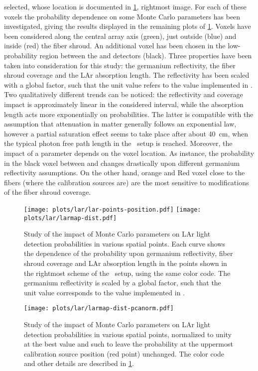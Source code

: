 selected, whose location is documented in \cref{fig:bkg:lar:ph2:larmap:dist}, rightmost
image. For each of these voxels the probability dependence on some Monte Carlo parameters
has been investigated, giving the results displayed in the remaining plots of
\cref{fig:bkg:lar:ph2:larmap:dist}. Voxels have been considered along the central array
axis (green), just outside (blue) and inside (red) the fiber shroud. An additional voxel
has been chosen in the low-probability region between the  and  detectors
(black). Three properties have been taken into consideration for this study: the germanium
reflectivity, the fiber shroud coverage and the LAr absorption length. The reflectivity
has been scaled with a global factor, such that the unit value refers to the value
implemented in \mage. Two qualitatively different trends can be noticed: the reflectivity
and coverage impact is approximately linear in the considered interval, while the
absorption length acts more exponentially on probabilities. The latter is compatible with
the assumption that attenuation in matter generally follows an exponential law, however a
partial saturation effect seems to take place after about 40~cm, when the typical photon
free path length in the \gerda\ setup is reached. Moreover, the impact of a parameter
depends on the voxel location. As instance, the probability in the black voxel between
 and  changes drastically upon different germanium reflectivity
assumptions. On the other hand, orange and Red voxel close to the fibers (where the
calibration sources are) are the most sensitive to modifications of the fiber shroud
coverage.

\begin{figure}
  \centering
  \texttt{[image: plots/lar/lar-points-position.pdf]}
  \texttt{[image: plots/lar/larmap-dist.pdf]}
  \caption{%
    Study of the impact of Monte Carlo parameters on LAr light detection probabilities in
    various spatial points. Each curve shows the dependence of the probability upon
    germanium reflectivity, fiber shroud coverage and LAr absorption length in the points
    shown in the rightmost scheme of the \gerda\ setup, using the same color code. The
    germanium reflectivity is scaled by a global factor, such that the unit value
    corresponds to the value implemented in \mage.
  }\label{fig:bkg:lar:ph2:larmap:dist}
\end{figure}

\begin{figure}
  \centering
  \texttt{[image: plots/lar/larmap-dist-pcanorm.pdf]}
  \caption{%
    Study of the impact of Monte Carlo parameters on LAr light detection probabilities in
    various spatial points, normalized to unity at the best value and such to leave the
    probability at the uppermost calibration source position (red point) unchanged.  The
    color code and other details are described in \cref{fig:bkg:lar:ph2:larmap:dist}.
  }\label{fig:bkg:lar:ph2:larmap:dist-pcanorm}
\end{figure}

